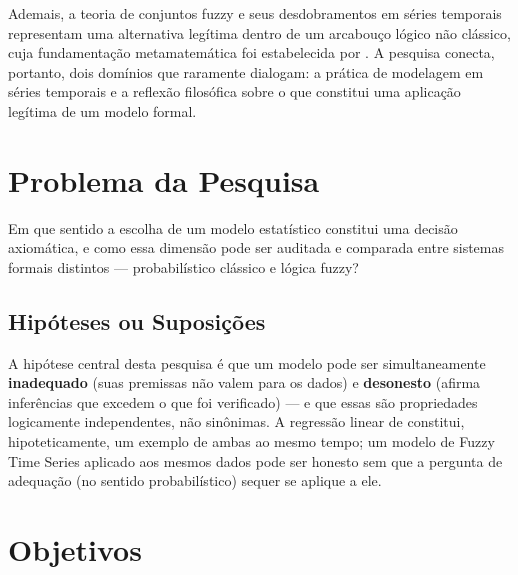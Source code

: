 \documentclass[
    12pt,
    oneside,
    openany,
    a4paper,
    english,
    brazil
]{abntex2}
\theoremstyle{definition}
\begin{document}
Ademais, a teoria de conjuntos fuzzy \cite{zadeh1965fuzzy} e seus desdobramentos em séries temporais \cite{song1993fuzzy, chen1996forecasting} representam uma alternativa legítima dentro de um arcabouço lógico não clássico, cuja fundamentação metamatemática foi estabelecida por . A pesquisa conecta, portanto, dois domínios que raramente dialogam: a prática de modelagem em séries temporais e a reflexão filosófica sobre o que constitui uma aplicação legítima de um modelo formal.

\section{Problema da Pesquisa}
\label{sec:problema}

Em que sentido a escolha de um modelo estatístico constitui uma decisão axiomática, e como essa dimensão pode ser auditada e comparada entre sistemas formais distintos --- probabilístico clássico e lógica fuzzy?

\subsection{Hipóteses ou Suposições}
\label{subsec:hipoteses}

A hipótese central desta pesquisa é que um modelo pode ser simultaneamente \textbf{inadequado} (suas premissas não valem para os dados) e \textbf{desonesto} (afirma inferências que excedem o que foi verificado) --- e que essas são propriedades logicamente independentes, não sinônimas. A regressão linear de  constitui, hipoteticamente, um exemplo de ambas ao mesmo tempo; um modelo de Fuzzy Time Series aplicado aos mesmos dados pode ser honesto sem que a pergunta de adequação (no sentido probabilístico) sequer se aplique a ele.

\section{Objetivos}
\label{sec:objetivos}

\end{document}
